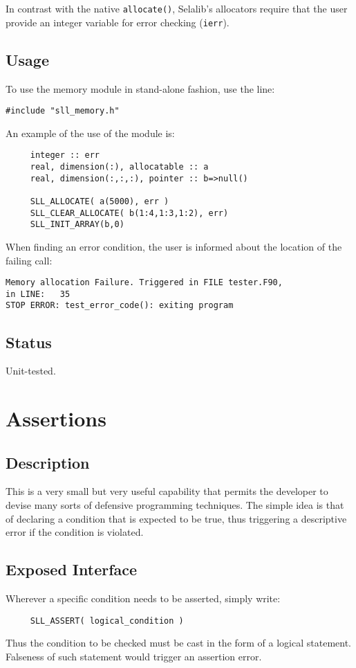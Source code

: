 \documentclass[]{report}   %
\begin{document}
In contrast with the native \verb+allocate()+, Selalib's allocators require that the user provide an integer variable for error checking (\verb+ierr+).

\subsection{Usage}

To use the memory module in stand-alone fashion, use the line:
\begin{verbatim}
#include "sll_memory.h"
\end{verbatim}
An example of the use of the module is:
\begin{verbatim}
     integer :: err
     real, dimension(:), allocatable :: a
     real, dimension(:,:,:), pointer :: b=>null()

     SLL_ALLOCATE( a(5000), err )
     SLL_CLEAR_ALLOCATE( b(1:4,1:3,1:2), err)
     SLL_INIT_ARRAY(b,0)
\end{verbatim}

When finding an error condition, the user is informed about the location of the failing call:

\begin{verbatim}
Memory allocation Failure. Triggered in FILE tester.F90, 
in LINE:   35
STOP ERROR: test_error_code(): exiting program
\end{verbatim}

\subsection{Status}
Unit-tested.

\section{Assertions}
\subsection{Description}
This is a very small but very useful capability that permits the developer to devise many sorts of defensive programming techniques. The simple idea is that of declaring a condition that is expected to be true, thus triggering a descriptive error if the condition is violated.

\subsection{Exposed Interface}
Wherever a specific condition needs to be asserted, simply write:
\begin{verbatim}
     SLL_ASSERT( logical_condition )
\end{verbatim}
Thus the condition to be checked must be cast in the form of a logical statement. Falseness of such statement would trigger an assertion error.
\end{document}
